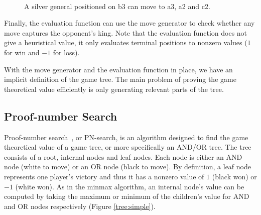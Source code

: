 \documentclass[a4paper, 11pt]{article}
\begin{document}
\begin{figure}[h]
\center
    \mbox{
       \quad
      }
\caption{A silver general positioned on b3 can move to a3, a2 and c2.}
\label{moveboard}
\end{figure}

Finally, the evaluation function can use the move generator to check whether any move captures the opponent's king. Note that the evaluation function
does not give a heuristical value, it only evaluates terminal positions to nonzero values ($1$ for win and $-1$ for loss).

With the move generator and the evaluation function in place, we have an implicit definition of the game tree. The main problem of proving the game
theoretical value efficiently is only generating relevant parts of the tree.

\subsection{Proof-number Search}
\label{pnsearch}
Proof-number search~\cite{allis1994proof}, or PN-search, is an algorithm designed to find the game theoretical value of a game tree, or more specifically an AND/OR tree.
The tree consists of a root, internal nodes and leaf nodes. Each node is either an AND node (white to move) or an OR node (black to move). By definition, a leaf
node represents one player's victory and thus it has a nonzero value of $1$ (black won) or $-1$ (white won). As in the minmax algorithm, an internal
node's value can be computed by taking the maximum or minimum of the children's value for AND and OR nodes respectively (Figure \ref{tree:simple}).
\end{document}
